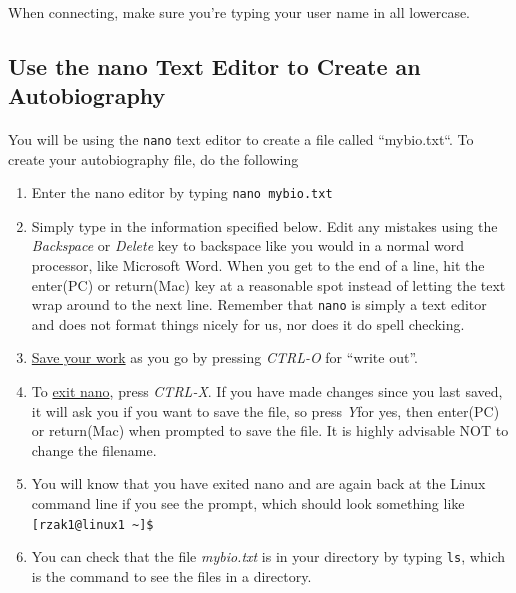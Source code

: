 \documentclass[letter,11pt]{article}
\begin{document}
\paragraph{}When connecting, make sure you're typing your user name in all lowercase.

\subsection{Use the nano Text Editor to Create an Autobiography}
\paragraph{}You will be using the \texttt{nano} text editor to create a file called ``mybio.txt``. To create your autobiography file, do the following

\begin{enumerate}
    \item Enter the nano editor by typing \texttt{nano mybio.txt}
    \item Simply type in the information specified below. Edit any mistakes using the \textit{Backspace} or \textit{Delete} key to backspace like you would in a normal word processor, like Microsoft Word. When you get to the end of a line, hit the enter(PC) or return(Mac) key at a reasonable spot instead of letting the text wrap around to the next line. Remember that \texttt{nano} is simply a text editor and does not format things nicely for us, nor does it do spell checking.
    \item \underline{Save your work} as you go by pressing \textit{CTRL-O} for ``write out''.
    \item To \underline{exit nano}, press \textit{CTRL-X}. If you have made changes since you last saved, it will ask you if you want to save the file, so press \textit{Y}for yes, then enter(PC) or return(Mac) when prompted to save the file. It is highly advisable NOT to change the filename.
    \item You will know that you have exited nano and are again back at the Linux command line if you see the prompt, which should look something like \verb|[rzak1@linux1 ~]$|
    \item You can check that the file \textit{mybio.txt} is in your directory by typing \texttt{ls}, which is the command to see the files in a directory.
\end{enumerate}
\end{document}
